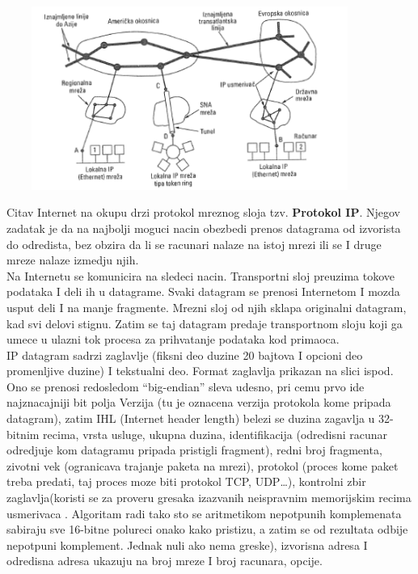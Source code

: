 \documentclass{article} %
\begin{document}
\begin{center}
\includegraphics[width=12cm, height=6cm]{okosnica}\\
\end{center}
Citav Internet na okupu drzi protokol mreznog sloja tzv. \textbf{Protokol IP}. Njegov zadatak je da na najbolji moguci nacin obezbedi prenos datagrama od izvorista do odredista, bez obzira da li se racunari nalaze na istoj mrezi ili se I druge mreze nalaze izmedju njih.\\

Na Internetu se komunicira na sledeci nacin. Transportni sloj preuzima tokove podataka I deli ih u datagrame. Svaki datagram se prenosi Internetom I mozda usput deli I na  manje fragmente. Mrezni sloj od njih sklapa originalni datagram, kad svi delovi stignu. Zatim se taj datagram predaje transportnom sloju koji ga umece u ulazni tok procesa za prihvatanje podataka kod primaoca.\\

IP datagram sadrzi zaglavlje (fiksni deo duzine 20 bajtova I opcioni deo promenljive duzine) I tekstualni deo. Format zaglavlja prikazan na slici ispod. Ono se prenosi redosledom  “big-endian” sleva udesno, pri cemu prvo ide najznacajniji bit polja Verzija (tu je oznacena verzija protokola kome pripada datagram), zatim IHL (Internet header length) belezi se duzina zagavlja u 32-bitnim recima, vrsta usluge, ukupna duzina, identifikacija (odredisni racunar odredjuje kom  datagramu pripada pristigli fragment), redni broj fragmenta, zivotni vek (ogranicava trajanje paketa na mrezi), protokol (proces kome paket treba predati, taj proces moze biti protokol TCP, UDP…), kontrolni zbir zaglavlja(koristi se za proveru gresaka izazvanih neispravnim memorijskim recima usmerivaca . Algoritam radi tako sto se aritmetikom nepotpunih komplemenata sabiraju sve 16-bitne polureci onako kako pristizu, a zatim se od rezultata odbije nepotpuni komplement. Jednak nuli ako nema greske), izvorisna adresa I odredisna adresa ukazuju na broj mreze I broj racunara, opcije.
\end{document}
